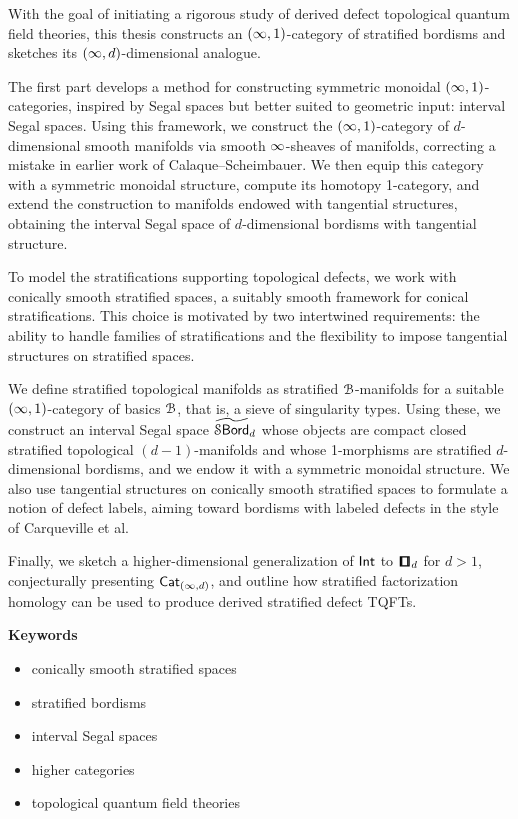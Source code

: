 With the goal of initiating a rigorous study of derived defect topological quantum field theories, this thesis constructs an $(\operatorname{\infty},1)$-category of stratified bordisms and sketches its $(\operatorname{\infty},d)$-dimensional analogue.

The first part develops a method for constructing symmetric monoidal $(\operatorname{\infty},1)$-categories, inspired by Segal spaces but better suited to geometric input: interval Segal spaces. Using this framework, we construct the $(\operatorname{\infty},1)$-category of $d$-dimensional smooth manifolds via smooth $\operatorname{\infty}$-sheaves of manifolds, correcting a mistake in earlier work of Calaque--Scheimbauer. We then equip this category with a symmetric monoidal structure, compute its homotopy 1-category, and extend the construction to manifolds endowed with tangential structures, obtaining the interval Segal space of $d$-dimensional bordisms with tangential structure.

To model the stratifications supporting topological defects, we work with conically smooth stratified spaces, a suitably smooth framework for conical stratifications. This choice is motivated by two intertwined requirements: the ability to handle families of stratifications and the flexibility to impose tangential structures on stratified spaces.

We define stratified topological manifolds as stratified $\mathcal B$-manifolds for a suitable $(\operatorname{\infty},1)$-category of basics $\mathcal B$, that is, a sieve of singularity types. Using these, we construct an interval Segal space $\operatorname{\widetilde{\mathcal S\mathsf{Bord}}}_d$ whose objects are compact closed stratified topological $(d-1)$-manifolds and whose 1-morphisms are stratified $d$-dimensional bordisms, and we endow it with a symmetric monoidal structure. We also use tangential structures on conically smooth stratified spaces to formulate a notion of defect labels, aiming toward bordisms with labeled defects in the style of Carqueville et al.

Finally, we sketch a higher-dimensional generalization of $\operatorname{\mathsf{Int}}$ to $\cube_d$ for $d>1$, conjecturally presenting $\operatorname{{\sf Cat}}_{(\operatorname{\infty},d)}$, and outline how stratified factorization homology can be used to produce derived stratified defect TQFTs.

\bigskip

\begin{samepage}
\noindent\textbf{Keywords}
\begin{itemize}[nosep]
    \item conically smooth stratified spaces
    \item stratified bordisms
    \item interval Segal spaces
    \item higher categories
    \item topological quantum field theories
\end{itemize}
\end{samepage}
